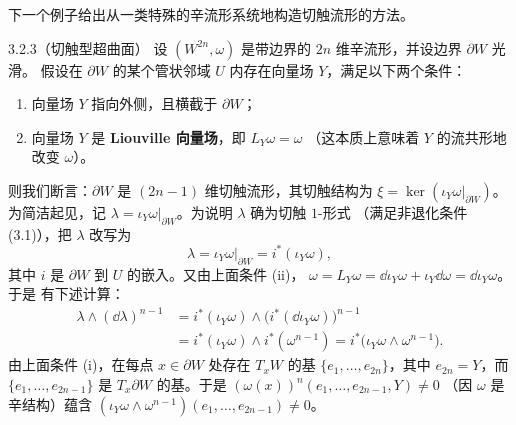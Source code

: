 
下一个例子给出从一类特殊的辛流形系统地构造切触流形的方法。

\begin{wexam}{3.2.3}（切触型超曲面）
设 $(W^{2n},\omega)$ 是带边界的 $2n$ 维辛流形，并设边界 $\partial W$ 光滑。
假设在 $\partial W$ 的某个管状邻域 $U$ 内存在向量场 $Y$，满足以下两个条件：
\begin{enumerate}[label=(\roman*)]
  \item 向量场 $Y$ 指向外侧，且横截于 $\partial W$；
  \item 向量场 $Y$ 是 \textbf{Liouville 向量场}，即 $L_Y\omega=\omega$
        （这本质上意味着 $Y$ 的流共形地改变 $\omega$）。
\end{enumerate}
则我们断言：$\partial W$ 是 $(2n-1)$ 维切触流形，其切触结构为
$\xi=\ker(\iota_Y\omega|_{\partial W})$。为简洁起见，记
$\lambda=\iota_Y\omega|_{\partial W}$。为说明 $\lambda$ 确为切触 $1$-形式
（满足非退化条件 (3.1)），把 $\lambda$ 改写为
\begin{equation}\tag{3.5}
  \lambda=\iota_Y\omega|_{\partial W}=i^*(\iota_Y\omega),
\end{equation}
其中 $i$ 是 $\partial W$ 到 $U$ 的嵌入。又由上面条件 (ii)，
$\omega=L_Y\omega=\dd\iota_Y\omega+\iota_Y\dd\omega=\dd\iota_Y\omega$。于是
有下述计算：
\begin{equation}\tag{3.6}
\begin{aligned}
  \lambda\wedge(\dd\lambda)^{n-1}
  &=i^*(\iota_Y\omega)\wedge\bigl(i^*(\dd\iota_Y\omega)\bigr)^{n-1}\\
  &=i^*(\iota_Y\omega)\wedge i^*(\omega^{n-1})
   =i^*\bigl(\iota_Y\omega\wedge\omega^{n-1}\bigr).
\end{aligned}
\end{equation}
由上面条件 (i)，在每点 $x\in\partial W$ 处存在 $T_xW$ 的基
$\{e_1,\dots,e_{2n}\}$，其中 $e_{2n}=Y$，而 $\{e_1,\dots,e_{2n-1}\}$ 是
$T_x\partial W$ 的基。于是 $(\omega(x))^n(e_1,\dots,e_{2n-1},Y)\neq0$
（因 $\omega$ 是辛结构）蕴含
$(\iota_Y\omega\wedge\omega^{n-1})(e_1,\dots,e_{2n-1})\neq0$。


\end{wexam}
